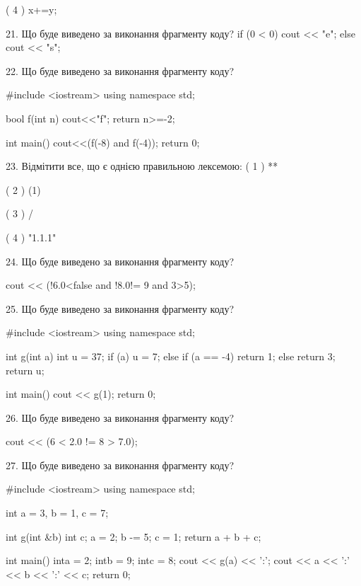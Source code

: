 \documentclass[11pt, ukrainian]{article}
\begin{document}
\begin{large}
( 4 ) x+=y;


21. Що буде виведено за виконання фрагменту коду?
if (0 < 0)
    cout << "e";
else
    cout << "s";



22. Що буде виведено за виконання фрагменту коду?

#include <iostream>
using namespace std;

bool f(int n){
    cout<<"f";
    return n>=-2;
}

int main(){
    cout<<(f(-8) and f(-4));
    return 0;
}


23. Відмітити все, що є однією правильною лексемою:
( 1 ) **

( 2 ) (1)

( 3 ) /

( 4 ) "1.1.1"


24. Що буде виведено за виконання фрагменту коду?

cout << (!6.0<false and !8.0!= 9 and 3>5);


25. Що буде виведено за виконання фрагменту коду?

#include <iostream>
using namespace std;

int g(int a){
    int u = 37;
    if (a) 
        u = 7;
    else if (a == -4)
         return 1;
    else
         return 3;
    return u;
}

int main(){
    cout << g(1);
    return 0;
}



26. Що буде виведено за виконання фрагменту коду?

cout << (6 < 2.0 != 8 > 7.0);


27. Що буде виведено за виконання фрагменту коду?

#include <iostream>
using namespace std;

int a = 3, b = 1, c = 7;

int g(int &b){
int c;    a = 2;
    b -= 5;
    c = 1;
    return a + b + c;
}

int main(){
    inta = 2;
    intb = 9;
    intc = 8;
    cout << g(a) << ':';
    cout << a << ':' << b << ':' << c;
    return 0; 
}


\end{large}
\end{document}
